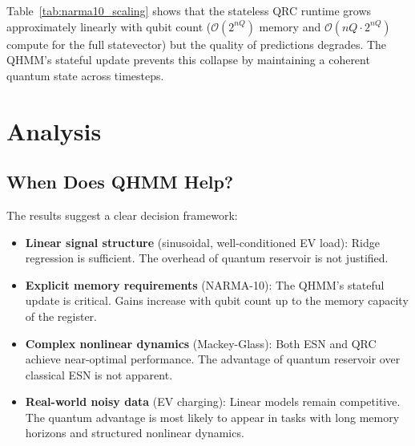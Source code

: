
Table~\ref{tab:narma10_scaling} shows that the stateless QRC runtime grows
approximately linearly with qubit count ($\mathcal{O}(2^{nQ})$ memory and
$\mathcal{O}(nQ \cdot 2^{nQ})$ compute for the full statevector) but the
quality of predictions degrades. The QHMM's stateful update prevents this
collapse by maintaining a coherent quantum state across timesteps.




\section{Analysis}
\label{sec:analysis}


\subsection{When Does QHMM Help?}


The results suggest a clear decision framework:

\begin{itemize}
  \item \textbf{Linear signal structure} (sinusoidal, well-conditioned
    EV load): Ridge regression is sufficient. The overhead of quantum
    reservoir is not justified.

  \item \textbf{Explicit memory requirements} (NARMA-10): The QHMM's
    stateful update is critical. Gains increase with qubit count up to
    the memory capacity of the register.

  \item \textbf{Complex nonlinear dynamics} (Mackey-Glass): Both ESN
    and QRC achieve near-optimal performance. The advantage of quantum
    reservoir over classical ESN is not apparent.

  \item \textbf{Real-world noisy data} (EV charging): Linear models
    remain competitive. The quantum advantage is most likely to appear
    in tasks with long memory horizons and structured nonlinear dynamics.
\end{itemize}

